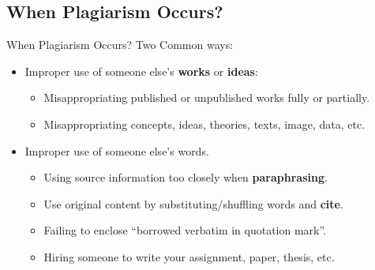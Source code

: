 \documentclass[11pt]{beamer}
\begin{document}
\subsection{When Plagiarism Occurs?}
\begin{frame}{When Plagiarism Occurs?}
		Two Common ways:
		\begin{itemize}
		\item Improper use of someone else's \textbf{works} or  \textbf{ideas}:
			\begin{itemize}
				\item Misappropriating published or unpublished works fully or partially.
				\smallskip
				\item Misappropriating concepts, ideas, theories, texts, image, data, etc.
			\end{itemize}
		
		\vspace{0.10 cm}
		\item Improper use of someone else's words.
			\begin{itemize}
				\item Using source information too closely when \textbf{paraphrasing}.
				\smallskip
				\item Use original content by substituting/shuffling words and \textbf{{cite}}.
				\smallskip
				\item Failing to enclose \textquotedblleft borrowed verbatim in quotation mark\textquotedblright.
				\smallskip
				\item Hiring someone to write your assignment, paper, thesis, etc.
		\end{itemize}
		\end{itemize}
\end{frame}

\end{document}
